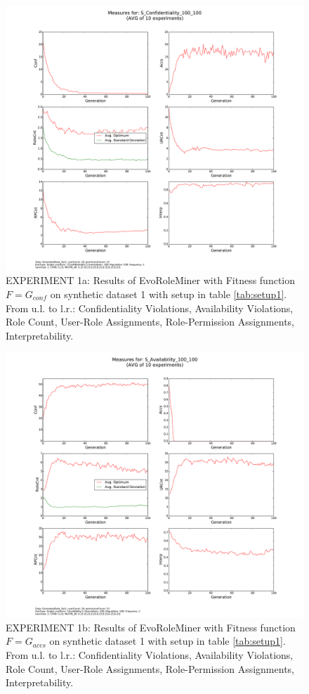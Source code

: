 \begin{figure}[H]
    \centering
    \includegraphics[scale=0.33, trim=4cm 2cm 4cm 0cm, clip=true]{./Figures/exp1conf}
    \caption{EXPERIMENT 1a: Results of EvoRoleMiner with Fitness function $F=G_{conf}$ on synthetic dataset 1 with setup in table \ref{tab:setup1}. From u.l. to l.r.: Confidentiality Violations, Availability Violations, Role Count, User-Role Assignments, Role-Permission Assignments, Interpretability.}
    \label{fig:exp1conf}
\end{figure}
\clearpage

\begin{figure}[H]
    \centering
    \includegraphics[scale=0.33, trim=4cm 2cm 4cm 0cm, clip=true]{./Figures/exp1accs}
    \caption{EXPERIMENT 1b: Results of EvoRoleMiner with Fitness function $F=G_{accs}$ on synthetic dataset 1 with setup in table \ref{tab:setup1}. From u.l. to l.r.: Confidentiality Violations, Availability Violations, Role Count, User-Role Assignments, Role-Permission Assignments, Interpretability.}
    \label{fig:exp1accs}
\end{figure}
\clearpage